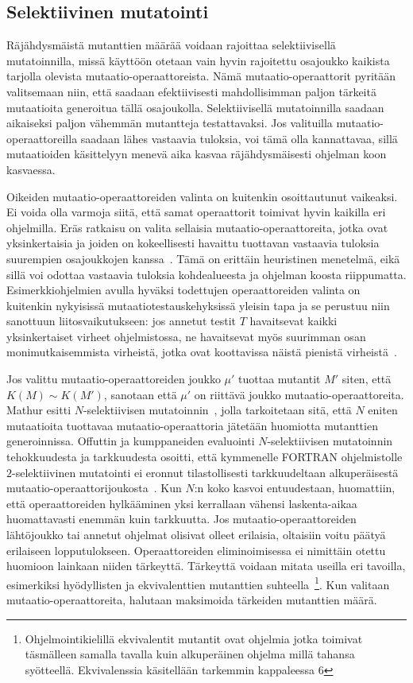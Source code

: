 \documentclass{tktltiki}
\begin{document}
\subsection{Selektiivinen mutatointi}
Räjähdysmäistä mutanttien määrää voidaan rajoittaa selektiivisellä mutatoinnilla, missä käyttöön otetaan vain hyvin rajoitettu osajoukko kaikista tarjolla olevista mutaatio-operaattoreista. Nämä mutaatio-operaattorit pyritään valitsemaan niin, että saadaan efektiivisesti mahdollisimman paljon tärkeitä mutaatioita generoitua tällä osajoukolla. Selektiivisellä mutatoinnilla saadaan aikaiseksi paljon vähemmän mutantteja testattavaksi. Jos valituilla mutaatio-operaattoreilla saadaan lähes vastaavia tuloksia, voi tämä olla kannattavaa, sillä mutaatioiden käsittelyyn menevä aika kasvaa räjähdysmäisesti ohjelman koon kasvaessa. 

Oikeiden mutaatio-operaattoreiden valinta on kuitenkin osoittautunut vaikeaksi. Ei voida olla varmoja siitä, että samat operaattorit toimivat hyvin kaikilla eri ohjelmilla. Eräs ratkaisu on valita sellaisia mutaatio-operaattoreita, jotka ovat yksinkertaisia ja joiden on kokeellisesti havaittu tuottavan vastaavia tuloksia suurempien osajoukkojen kanssa~\cite{GrunSZ09}. Tämä on erittäin heuristinen menetelmä, eikä sillä voi odottaa vastaavia tuloksia kohdealueesta ja ohjelman koosta riippumatta. Esimerkkiohjelmien avulla hyväksi todettujen operaattoreiden valinta on kuitenkin nykyisissä mutaatiotestauskehyksissä yleisin tapa ja se perustuu niin sanottuun liitosvaikutukseen: jos annetut testit $T$ havaitsevat kaikki yksinkertaiset virheet ohjelmistossa, ne havaitsevat myös suurimman osan monimutkaisemmista virheistä, jotka ovat koottavissa näistä pienistä virheistä~\cite{DeMilloLS78}. 

Jos valittu mutaatio-operaattoreiden joukko $\mu'$ tuottaa mutantit $M'$ siten, että $K(M) \sim K(M')$, sanotaan että $\mu'$ on riittävä joukko mutaatio-operaattoreita. Mathur esitti $N$-selektiivisen mutatoinnin~\cite{Mathur91}, jolla tarkoitetaan sitä, että $N$ eniten mutaatioita tuottavaa mutaatio-operaattoria jätetään huomiotta mutanttien generoinnissa. Offuttin ja kumppaneiden evaluointi $N$-selektiivisen mutatoinnin tehokkuudesta ja tarkkuudesta osoitti, että kymmenelle FORTRAN ohjelmistolle $2$-selektiivinen mutatointi ei eronnut tilastollisesti tarkkuudeltaan alkuperäisestä mutaatio-operaattorijoukosta~\cite{OffuttRZ93}. Kun $N$:n koko kasvoi entuudestaan, huomattiin, että operaattoreiden hylkääminen yksi kerrallaan vähensi laskenta-aikaa huomattavasti enemmän kuin tarkkuutta. Jos mutaatio-operaattoreiden lähtöjoukko tai annetut ohjelmat olisivat olleet erilaisia, oltaisiin voitu päätyä erilaiseen lopputulokseen. Operaattoreiden eliminoimisessa ei nimittäin otettu huomioon lainkaan niiden tärkeyttä. Tärkeyttä voidaan mitata useilla eri tavoilla, esimerkiksi hyödyllisten ja ekvivalenttien mutanttien suhteella~\footnote{Ohjelmointikielillä ekvivalentit mutantit ovat ohjelmia jotka toimivat täsmälleen samalla tavalla kuin alkuperäinen ohjelma millä tahansa syötteellä. Ekvivalenssia käsitellään tarkemmin kappaleessa 6}. Kun valitaan mutaatio-operaattoreita, halutaan maksimoida tärkeiden mutanttien määrä.
\end{document}

